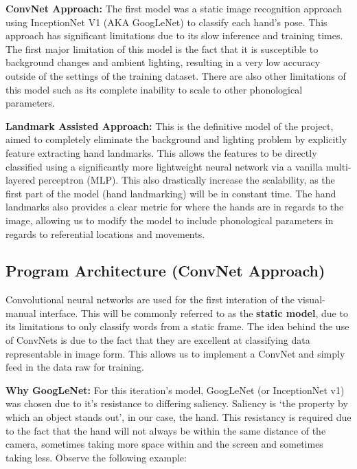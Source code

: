 \documentclass[11pt]{article}
\def\paraskip{\vskip 0.4cm}
\begin{document}
        \paraskip

        \noindent\textbf{ConvNet Approach: } The first model was a static image recognition approach using InceptionNet V1 (AKA GoogLeNet) to classify each hand's pose. This approach has significant limitations due to its slow inference and training times. The first major limitation of this model is the fact that it is susceptible to background changes and ambient lighting, resulting in a very low accuracy outside of the settings of the training dataset. There are also other limitations of this model such as its complete inability to scale to other phonological parameters.

        \paraskip

        \noindent\textbf{Landmark Assisted Approach: } This is the definitive model of the project, aimed to completely eliminate the background and lighting problem by explicitly feature extracting hand landmarks. This allows the features to be directly classified using a significantly more lightweight neural network via a vanilla multi-layered perceptron (MLP). This also drastically increase the scalability, as the first part of the model (hand landmarking) will be in constant time. The hand landmarks also provides a clear metric for where the hands are in regards to the image, allowing us to modify the model to include phonological parameters in regards to referential locations and movements.

    \subsection{Program Architecture (ConvNet Approach)}
        Convolutional neural networks are used for the first interation of the visual-manual interface. This will be commonly referred to as the \textbf{static model}, due to its limitations to only classify words from a static frame. The idea behind the use of ConvNets is due to the fact that they are excellent at classifying data representable in image form. This allows us to implement a ConvNet and simply feed in the data raw for training. 
        
        \paraskip

        \noindent\textbf{Why GoogLeNet: } For this iteration's model, GoogLeNet (or InceptionNet v1) was chosen due to it's resistance to differing saliency. Saliency is `the property by which an object stands out', in our case, the hand. This resistancy is required due to the fact that the hand will not always be within the same distance of the camera, sometimes taking more space within and the screen and sometimes taking less. Observe the following example:
\end{document}
